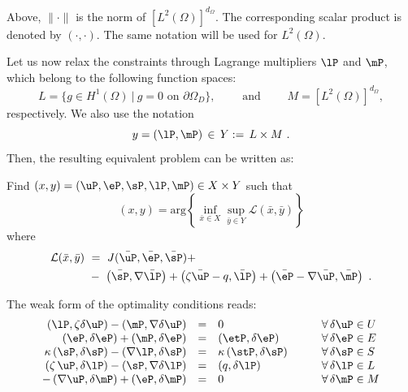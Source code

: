 \begin{remark}
	Above, $\|\cdot\|$ is the norm of $\left[L^2(\Omega)\right]^{d_{\Omega}}$. The corresponding scalar product is denoted by $\left ( \cdot , \cdot \right )$. The same notation will be used for $L^2(\Omega)$.
\end{remark}
Let us now relax the constraints through Lagrange multipliers $\lP$ and $\mP$, which belong to the following function spaces:
\begin{equation*}
	L=\{g\in H^1(\Omega)~|~g=0 \mbox{ on } \partial \Omega_D\},\qquad
	\mbox{ and }\qquad M=\left[L^2(\Omega)\right]^{d_{\Omega}},  
\end{equation*}
respectively. We also use the notation
\begin{equation}
	y=\left (\lP,\mP\right )\,\in \, Y:=\,L\times M~.
\end{equation}
Then, the resulting equivalent problem can be written as: 
\begin{tcolorbox}[colback=black!10!white, halign = justify, boxrule=0pt]
	\begin{problem*}[P2]
		Find $(x,y)=\left( \uP, \eP, \sP, \lP, \mP \right) \in X\times Y$ such that 
		\begin{equation}
			(x,y)= \mbox{arg} \left \{ \inf_{\bar{x}\in X} \sup_{\bar{y}\in Y} 
			\mathcal{L}(\bar{x},\bar{y})
			\right \}
		\end{equation}
		where
		\begin{equation}
			\begin{aligned}
				\mathcal{L}(\bar{x},\bar{y}) &~=~J(\bar{\uP},\bar{\eP},\bar{\sP})+ \nonumber \\
				&~-~\left ( \bar{\sP},\nabla \bar{\lP} \right ) + \left (\zeta \bar{\uP} - q , \bar{\lP} \right )  
				+ \left ( \bar{\eP}-\nabla \bar{\uP}, \bar{\mP} \right ) ~.
			\end{aligned} \label{eq:lagrangian}
		\end{equation}
	\end{problem*}
\end{tcolorbox}
The weak form of the optimality conditions reads:
\begin{equation}\label{eq:variational_form}
	\begin{array}{rcll}
		\left ( \lP, \zeta \delta \uP \right ) - \left ( \mP, \nabla \delta \uP \right ) & = & 0 &\qquad \forall \,\delta \uP \in U \\
		\left ( \eP, \delta \eP \right ) + \left ( \mP, \delta \eP \right ) &=& \left ( \etP, \delta \eP \right )  &\qquad \forall \,\delta \eP \in E\\
		\kappa \left ( \sP, \delta \sP \right ) - \left ( \nabla \lP, \delta \sP \right )  & = & \kappa \left ( \stP,\delta \sP \right ) &\qquad \forall\, \delta \sP \in S \\
		\left ( \zeta \,\uP, \delta \lP \right )-\left ( \sP, \nabla \delta \lP \right )  &=& \left ( q, \delta \lP \right ) 	&\qquad \forall\,\delta \lP \in L\\
		-\left (\nabla \uP,\delta \mP \right ) + \left ( \eP, \delta \mP \right ) & = & 0 &\qquad \forall \, \delta \mP \in M 
	\end{array}
\end{equation}

